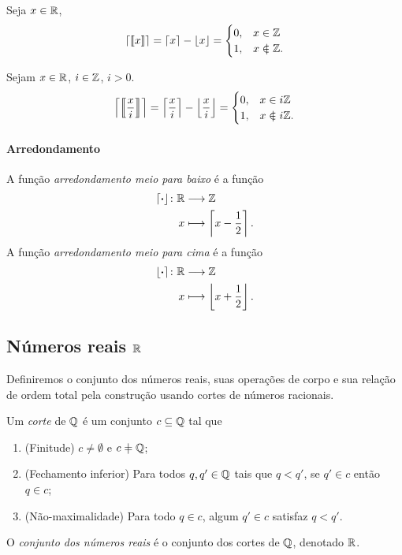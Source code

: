 \begin{exercise}
Seja $x \in \mathbb{R}$,
	\begin{equation*}
	\teto{\resfra{x}} = \teto{x} - \chao{x} = \begin{cases}
			0,& x \in \Z \\
			1,& x \notin \Z.
		\end{cases}
	\end{equation*}
\end{exercise}


\begin{exercise}
Sejam $x \in \mathbb{R}$, $i \in \mathbb{Z}$, $i > 0$.
	\begin{equation*}
	\teto{\resfra{ \frac{x}{i} }} = \teto{\frac{x}{i}} - \chao{\frac{x}{i}}  = \begin{cases}
			0,& x \in i\Z \\
			1,& x \notin i\Z.
		\end{cases}
	\end{equation*}
\end{exercise}


\paragraph{Arredondamento}

\begin{definition}
A função \emph{arredondamento meio para baixo} é a função
	\begin{align*}
	{\left\lceil{\bm{\cdot}}\right\rfloor}\colon {\mathbb{R}} &\longrightarrow {\mathbb{Z}} \\{x} &\longmapsto \left\lceil{x-\frac{1}{2}}\right\rceil.
	\end{align*}
A função \emph{arredondamento meio para cima} é a função
	\begin{align*}
	{\left\lfloor{\bm{\cdot}}\right\rceil}\colon {\mathbb{R}} &\longrightarrow {\mathbb{Z}} \\{x} &\longmapsto \left\lfloor{x+\frac{1}{2}}\right\rfloor.
	\end{align*}
\end{definition}

\subsection{Números reais \ensuremath{\R}}

Definiremos o conjunto dos números reais, suas operações de corpo e sua relação de ordem total pela construção usando cortes de números racionais.

\begin{definition}
Um \emph{corte} de $\mathbb{Q}$ é um conjunto $c \subseteq \mathbb{Q}$ tal que
	\begin{enumerate}
	\item (Finitude) $c \neq \emptyset$ e $c \neq \Q$;
	\item (Fechamento inferior) Para todos $q, q' \in \mathbb{Q}$ tais que $q < q'$, se $q' \in c$ então $q \in c$;
	\item (Não-maximalidade) Para todo $q \in c$, algum $q' \in c$ satisfaz $q < q'$.
	\end{enumerate}
O \emph{conjunto dos números reais} é o conjunto dos cortes de $\mathbb{Q}$, denotado $\mathbb{R}$.
\end{definition}

